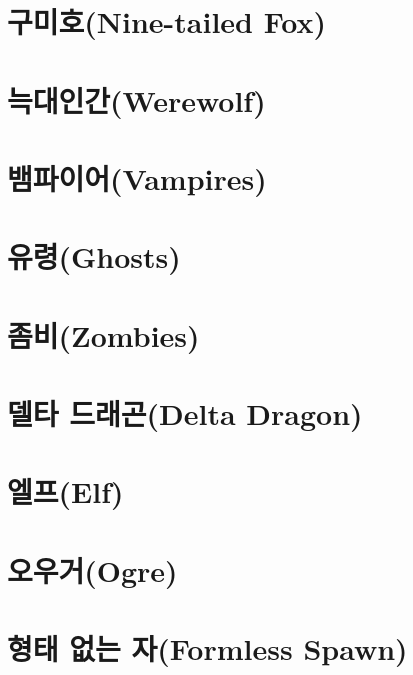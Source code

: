 \documentclass{report}
\begin{document}
	\section{구미호(Nine-tailed Fox)}
		
	
	\section{늑대인간(Werewolf)}
		
	
	\section{뱀파이어(Vampires)}
		
	
	\section{유령(Ghosts)}
		
	
	\section{좀비(Zombies)}
		
	
	\section{델타 드래곤(Delta Dragon)}
		
	
	\section{엘프(Elf)}
		
	
	\section{오우거(Ogre)}
		
	
	\section{형태 없는 자(Formless Spawn)}
		
	
\end{document}
